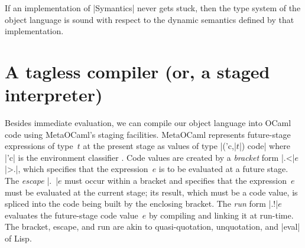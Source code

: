 \begin{proposition}
  If an implementation of |Symantics| never gets stuck, then
  the type system of the object
  language is sound with respect to the dynamic semantics defined by
  that implementation.
\end{proposition}
\begin{comment}
For variety, we show another interpreter, which measures the \emph{size}
of each object term, defined as the number of term
constructors. The following is slightly abbreviated code (see the
accompanying source code for the complete definition).
\begin{code}
module L = struct
  type ('c,'dv) repr = int
  let int (x:int)  = 1
  let lam f        = f 0 + 1
  let app e1 e2    = e1 + e2 + 1
  let fix f        = f 0 + 1
  let mul e1 e2    = e1 + e2 + 1
  let if_ eb et ee = eb + et () + ee () + 1
end
\end{code}
Now the expression
\begin{code}
let module E = EX(L) in E.test1 ()
\end{code}
evaluates to |3|. This interpreter is not only tagless but also
total. It ``evaluates'' even seemingly divergent terms like
\begin{code}
app (fix (fun self -> self)) (int 1)
\end{code}

module EX1(S: Symantics) = struct
 open S
 let tfix () = app (fix (fun self -> self)) (int 1)
end;;
let module E =EX1(R) in E.tfix ();;
let module E =EX1(L) in E.tfix ();;
\end{comment}

\section{A tagless compiler (or, a staged interpreter)}\label{compiler}
\vspace{-5pt}
Besides immediate evaluation, we can compile our object language
into OCaml code using MetaOCaml's staging facilities. MetaOCaml
represents future-stage expressions of type~$t$ at the
present stage as values of type |('c,|$t$|) code| where |'c| is the
environment classifier \cite{WalidPOPL03,calcagno-ml-like}. Code values are created
by a \emph{bracket} form |.<|$e$|>.|, which specifies that the expression~$e$ is to be
evaluated at a future stage. The \emph{escape} |.~|$e$ must occur
within a bracket and specifies that the expression~$e$ must be evaluated
at the current stage; its result, which must be a code value, is
spliced into the code being built by the enclosing bracket. The \emph{run} form |.!|$e$ evaluates
the future-stage code value~$e$ by compiling and linking it at run-time.
The bracket, escape, and run are akin to
quasi-quotation, unquotation, and |eval| of Lisp.

